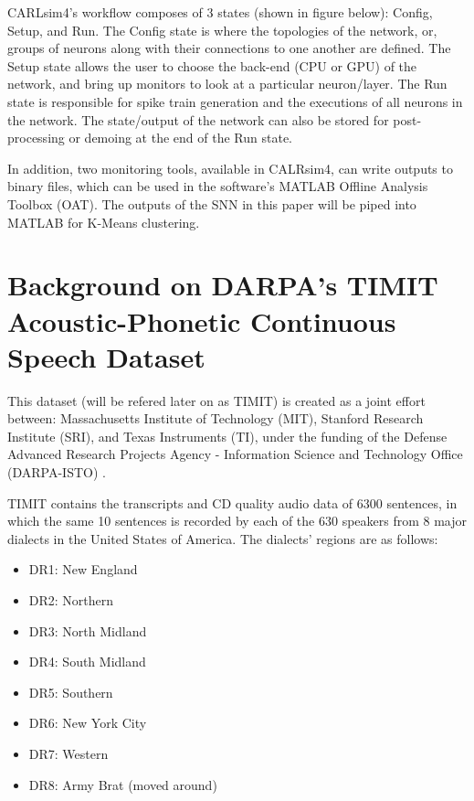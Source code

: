 \documentclass[11pt]{article}  %
\begin{document}
CARLsim4's workflow composes of 3 states (shown in figure below): Config, Setup, and Run. The Config state is where the topologies of the network, or, groups of neurons along with their connections to one another are defined. The Setup state allows the user to choose the back-end (CPU or GPU) of the network, and bring up monitors to look at a particular neuron/layer. The Run state is responsible for spike train generation and the executions of all neurons in the network. The state/output of the network can also be stored for post-processing or demoing at the end of the Run state.


In addition, two monitoring tools, available in CALRsim4, can write outputs to binary files, which can be used in the software's MATLAB Offline Analysis Toolbox (OAT). The outputs of the SNN in this paper will be piped into MATLAB for K-Means clustering.

\section{Background on DARPA's TIMIT Acoustic-Phonetic Continuous Speech Dataset}
\label{dataset}

This dataset (will be refered later on as TIMIT) is created as a joint effort between: Massachusetts Institute of Technology (MIT), Stanford Research Institute (SRI), and Texas Instruments (TI), under the funding of the Defense Advanced Research Projects Agency - Information Science and Technology Office (DARPA-ISTO) \cite{b7}. 

TIMIT contains the transcripts and CD quality audio data of 6300 sentences, in which the same 10 sentences is recorded by each of the 630 speakers from 8 major dialects in the United States of America. The dialects' regions are as follows:

\begin{itemize}
	\item DR1: New England
	\item DR2: Northern
	\item DR3: North Midland
	\item DR4: South Midland
	\item DR5: Southern
	\item DR6: New York City
	\item DR7: Western
	\item DR8: Army Brat (moved around)
\end{itemize}
\end{document}
